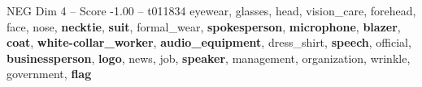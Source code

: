 \begin{textsample}{NEG Dim 4 – Score -1.00 – t011834}  \label{ex:f4_neg_028}
eyewear, glasses, head, vision\_care, forehead, face, nose, \textbf{necktie}, \textbf{suit}, formal\_wear, \textbf{spokesperson}, \textbf{microphone}, \textbf{blazer}, \textbf{coat}, \textbf{white-collar\_worker}, \textbf{audio\_equipment}, dress\_shirt, \textbf{speech}, official, \textbf{businessperson}, \textbf{logo}, news, job, \textbf{speaker}, management, organization, wrinkle, government, \textbf{flag}

\end{textsample}
